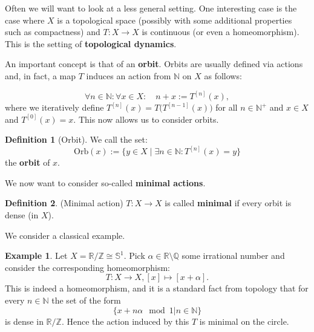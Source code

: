 \documentclass[11pt]{article}
\theoremstyle{definition}              %
\newtheorem{definition}{Definition}[section]
\theoremstyle{definition}              %
\newtheorem{example}{Example}[section]
\theoremstyle{definition}              %
\begin{document}
Often we will want to look at a less general setting. One interesting case is the case where $X$ is a topological space (possibly with some additional properties such as compactness) and $T: X \to X$ is continuous (or even a homeomorphism). This is the setting of \textbf{topological dynamics}.

An important concept is that of an \textbf{orbit}. Orbits are usually defined via actions and, in fact, a map $T$ induces an action from $\mathbb{N}$ on $X$ as follows:

\begin{equation}\label{eq1}
    \forall n \in \mathbb{N}: \forall x \in X: \quad n+x := T^{[n]}(x),
\end{equation}
where we iteratively define $T^{[n]}(x)=T \big(T^{[n-1]}(x) \big)$ for all $n \in \mathbb{N}^+$ and $x \in X$ and $T^{[0]}(x)=x$. This now allows us to consider orbits.

\begin{definition}[Orbit]
    We call the set:
    \begin{equation}
        \text{Orb}(x) :=\{y \in X \mid \exists n \in \mathbb{N}: T^{[n]}(x)=y\}
    \end{equation}
    the \textbf{orbit} of $x$.
\end{definition}

We now want to consider so-called \textbf{minimal actions}.

\begin{definition}(Minimal action)
    $T:X \to X$ is called \textbf{minimal} if every orbit is dense (in $X$).
\end{definition}

We consider a classical example.

\begin{example}
    Let $X=\mathbb{R} / \mathbb{Z} \cong \mathbb{S}^1$. Pick $\alpha \in \mathbb{R} \setminus \mathbb{Q}$ some irrational number and consider the corresponding homeomorphism:
    \begin{equation}
        T:X \to X, [x] \mapsto [x+\alpha].
    \end{equation}
    This is indeed a homeomorphism, and it is a standard fact from topology that for every $n \in \mathbb{N}$ the set of the form
    \begin{equation}
        \{x + n \alpha \mod 1 | n \in \mathbb{N} \}
    \end{equation}
    is dense in $\mathbb{R}/\mathbb{Z}$. Hence the action induced by this $T$ is minimal on the circle.
\end{example}
\end{document}
